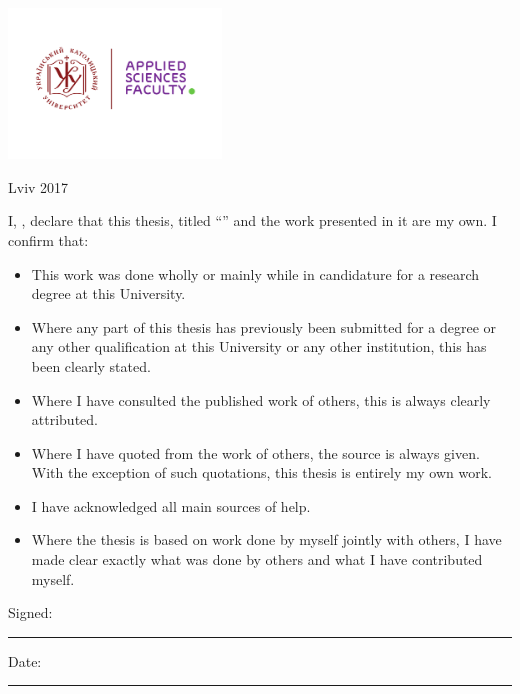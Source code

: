 \documentclass[
12pt, %
oneside, %
english, %
onehalfspacing, %
nolistspacing, %
liststotoc, %
parskip, %
headsepline, %
]{MastersDoctoralThesis} %
\begin{document}
\begin{titlepage}
\begin{center}
\includegraphics[height=4cm]{UCU-Apps.png} %

{\large Lviv 2017}\\[2cm] %
 
\vfill
\end{center}
\end{titlepage}


\begin{declaration}
\addchaptertocentry{\authorshipname} %
\noindent I, \authorname, declare that this thesis, titled \enquote{\ttitle} and the work presented in it are my own. I confirm that:

\begin{itemize} 
\item This work was done wholly or mainly while in candidature for a research degree at this University.
\item Where any part of this thesis has previously been submitted for a degree or any other qualification at this University or any other institution, this has been clearly stated.
\item Where I have consulted the published work of others, this is always clearly attributed.
\item Where I have quoted from the work of others, the source is always given. With the exception of such quotations, this thesis is entirely my own work.
\item I have acknowledged all main sources of help.
\item Where the thesis is based on work done by myself jointly with others, I have made clear exactly what was done by others and what I have contributed myself.\\
\end{itemize}
 
\noindent Signed:\\
\rule[0.5em]{25em}{0.5pt} %
 
\noindent Date:\\
\rule[0.5em]{25em}{0.5pt} %
\end{declaration}
\end{document}
